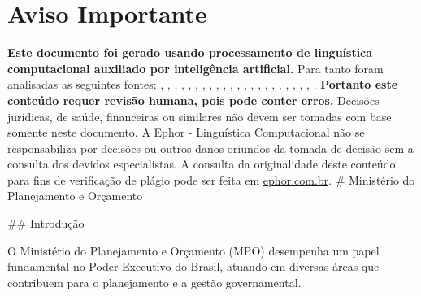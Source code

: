 \documentclass[
   article,       
   12pt,          
   oneside,       
   a4paper,       
   english,       
   brazil,        
   sumario=tradicional
   ]{abntex2}
\begin{document}
\frenchspacing 
\maketitle

\textual
\section{Aviso Importante}
\textbf{Este documento foi gerado usando processamento de linguística computacional auxiliado por inteligência artificial.} Para tanto foram analisadas as seguintes fontes:  \cite{A_CAUSA_E_AS_POLITICAS_DE_DIREITOS_HUMANOS_NO}, \cite{Ciclo_de_Politicas_Publicas_por_que_e_importa}, \cite{Conheca_o_ciclo_das_politicas_publicas__Polit}, \cite{Educacao_Inclusiva_Conheca_o_historico_da_leg}, \cite{Em_Buenos_Aires_Silvio_Almeida_defende_a_inst}, \cite{Entendendo_a_Tipologia_de_Politicas_Publicas_}, \cite{Escola_Nacional_de_Administracao_Publica__Wik}, \cite{Especialista_em_politicas_publicas_e_gestao_g}, \cite{FEDERALISMO_E_POLITICAS_PUBLICAS_NO_BRASIL_Ho}, \cite{Institucionalizacao_das_politicas_em_Direitos}, \cite{Ministerio_do_Planejamento_e_Orcamento__Wikip}, \cite{Ministro_defende_que_direitos_humanos_precisa}, \cite{Politica_conceito_politicas_publicas_e_partid}, \cite{Politica_publica__o_que_e_tipos_de_politicas_}, \cite{Politica_publica__Wikipedia_a_enciclopedia_li}, \cite{Politicas_publicas__Wikipedia_la_enciclopedia}, \cite{Politicas_Publicas_entenda_o_que_sao_para_que}, \cite{Politicas_Publicas_o_que_sao_e_para_que_serve}, \cite{Politicas_publicas_o_que_sao_e_para_que_serve}, \cite{Politicas_publicas_o_que_sao_quem_faz_e_tipos}, \cite{Politicas_publicas_o_que_sao_tipos_e_exemplos}, \cite{Revista_USP_119__Dossie_1_Democracia_e_politi}, \cite{TCU_Ciclo_das_politicas_publicas__Tudo_o_que_}.
\textbf{Portanto este conteúdo requer revisão humana, pois pode conter erros.} Decisões jurídicas, de saúde, financeiras ou similares não devem ser tomadas com base somente neste documento. A Ephor - Linguística Computacional não se responsabiliza por decisões ou outros danos oriundos da tomada de decisão sem a consulta dos devidos especialistas.
A consulta da originalidade deste conteúdo para fins de verificação de plágio pode ser feita em \href{http://www.ephor.com.br}{ephor.com.br}.
# Ministério do Planejamento e Orçamento

## Introdução

O Ministério do Planejamento e Orçamento (MPO) desempenha um papel fundamental no Poder Executivo do Brasil, atuando em diversas áreas que contribuem para o planejamento e a gestão governamental.
\end{document}
